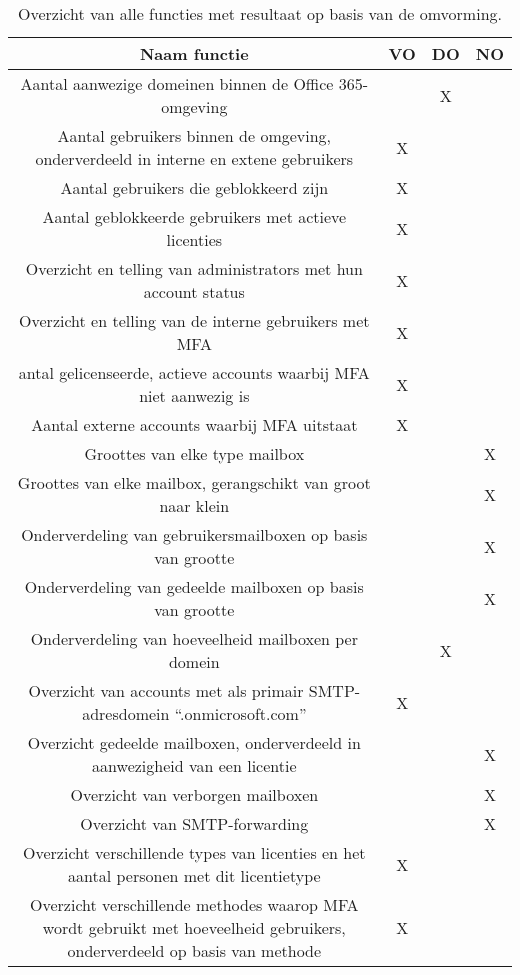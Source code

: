 \begin{table}[h]
    \centering
    \begin{adjustbox}{max width=\textwidth}
        \begin{tabular}{ |c||c|c|c| } 
            \hline
            \textbf{Naam functie} & \textbf{VO} & \textbf{DO} & \textbf{NO} \\
            \hline
            Aantal aanwezige domeinen binnen de Office 365-omgeving &  & X & \\
            Aantal gebruikers binnen de omgeving, onderverdeeld in interne en extene gebruikers & X &  & \\
            Aantal gebruikers die geblokkeerd zijn & X & & \\
            Aantal geblokkeerde gebruikers met actieve licenties & X & & \\
            Overzicht en telling van administrators met hun account status & X & & \\
            Overzicht en telling van de interne gebruikers met MFA & X & & \\
            antal gelicenseerde, actieve accounts waarbij MFA niet aanwezig is & X & & \\
            Aantal externe accounts waarbij MFA uitstaat & X & &  \\
            Groottes van elke type mailbox & & & X \\
            Groottes van elke mailbox, gerangschikt van groot naar klein & & & X \\ 
            Onderverdeling van gebruikersmailboxen op basis van grootte & & & X \\ 
            Onderverdeling van gedeelde mailboxen op basis van grootte & & & X \\ 
            Onderverdeling van hoeveelheid mailboxen per domein & & X & \\ 
            Overzicht van accounts met als primair SMTP-adresdomein “.onmicrosoft.com” & X & & \\
            Overzicht gedeelde mailboxen, onderverdeeld in aanwezigheid van een licentie & & & X \\ 
            Overzicht van verborgen mailboxen & & & X \\ 
            Overzicht van SMTP-forwarding & & & X \\ 
            Overzicht verschillende types van licenties en het
            aantal personen met dit licentietype & X & & \\ 
            Overzicht verschillende methodes waarop MFA wordt gebruikt met hoeveelheid gebruikers, onderverdeeld op basis van methode & X & & \\ 
            \hline
        \end{tabular}
    \end{adjustbox}
    \caption[Overzicht resultaten functies]{Overzicht van alle functies met resultaat op basis van de omvorming.}
    \label{POC}
\end{table}

